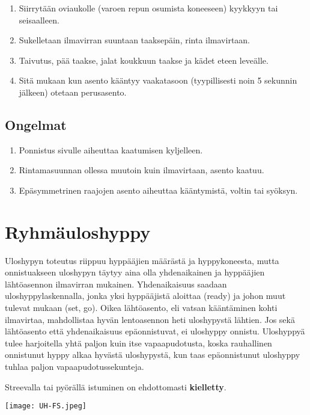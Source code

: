 \begin{enumerate}[label=\bfseries \arabic*)]
\item  Siirrytään oviaukolle (varoen repun osumista koneeseen) kyykkyyn tai seisaalleen. 
\item  Sukelletaan ilmavirran suuntaan taaksepäin, rinta ilmavirtaan. 
\item  Taivutus, pää taakse, jalat koukkuun taakse ja kädet eteen leveälle. 
\item  Sitä mukaan kun asento kääntyy vaakatasoon (tyypillisesti noin 5 sekunnin jälkeen) otetaan perusasento. 
\end{enumerate}
\subsection{ Ongelmat }
\label{uloshyppytyylit-ongelmat}

\begin{enumerate}[label=\bfseries \arabic*)]
\item  Ponnistus sivulle aiheuttaa kaatumisen kyljelleen. 
\item  Rintamasuunnan ollessa muutoin kuin ilmavirtaan, asento kaatuu. 
\item  Epäsymmetrinen raajojen asento aiheuttaa kääntymistä, voltin tai syöksyn. 
\end{enumerate}
\section{ Ryhmäuloshyppy }
\label{uloshyppytyylit-ryhmauloshyppy}


Uloshypyn toteutus riippuu hyppääjien määrästä ja hyppykoneesta, mutta onnistuakseen uloshypyn täytyy aina olla yhdenaikainen ja hyppääjien lähtöasennon ilmavirran mukainen. Yhdenaikaisuus saadaan uloshyppylaskennalla, jonka yksi hyppääjistä aloittaa (ready) ja johon muut tulevat mukaan (set, go). Oikea lähtöasento, eli vatsan kääntäminen kohti ilmavirtaa, mahdollistaa hyvän lentoasennon heti uloshypystä lähtien. Jos sekä lähtöasento että yhdenaikaisuus epäonnistuvat, ei uloshyppy onnistu. Uloshyppyä tulee harjoitella yhtä paljon kuin itse vapaapudotusta, koska rauhallinen onnistunut hyppy alkaa hyvästä uloshypystä, kun taas epäonnistunut uloshyppy tuhlaa paljon vapaapudotussekunteja. 


Streevalla tai pyörällä istuminen on ehdottomasti \textbf{kielletty}. 


\begin{Figure}\centering\texttt{[image: UH-FS.jpeg]}\end{Figure} 

